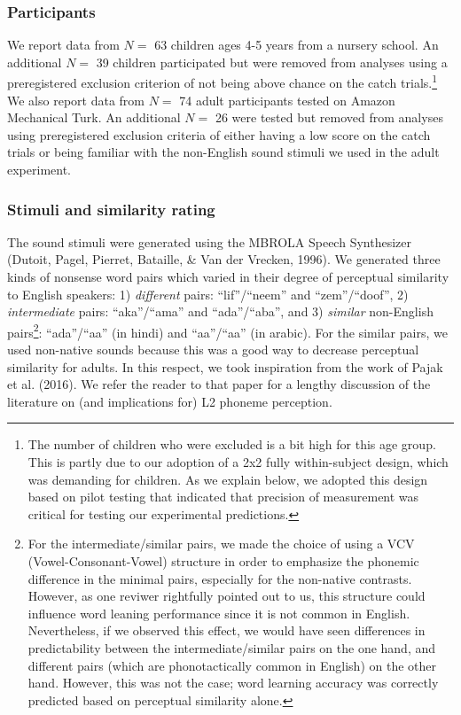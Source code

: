\documentclass[english,,man]{apa6}
\let\rmarkdownfootnote\footnote%
\def\footnote{\protect\rmarkdownfootnote}
\begin{document}
\hypertarget{participants}{%
\subsubsection{Participants}\label{participants}}

We report data from \(N=\) 63 children ages 4-5 years from a nursery school. An additional \(N=\) 39 children participated but were removed from analyses using a preregistered exclusion criterion of not being above chance on the catch trials.\footnote{The number of children who were excluded is a bit high for this age group. This is partly due to our adoption of a 2x2 fully within-subject design, which was demanding for children. As we explain below, we adopted this design based on pilot testing that indicated that precision of measurement was critical for testing our experimental predictions.} We also report data from \(N=\) 74 adult participants tested on Amazon Mechanical Turk. An additional \(N=\) 26 were tested but removed from analyses using preregistered exclusion criteria of either having a low score on the catch trials or being familiar with the non-English sound stimuli we used in the adult experiment.

\hypertarget{stimuli-and-similarity-rating}{%
\subsubsection{Stimuli and similarity rating}\label{stimuli-and-similarity-rating}}

The sound stimuli were generated using the MBROLA Speech Synthesizer (Dutoit, Pagel, Pierret, Bataille, \& Van der Vrecken, 1996). We generated three kinds of nonsense word pairs which varied in their degree of perceptual similarity to English speakers: 1) \emph{different} pairs: \enquote{lif}/\enquote{neem} and \enquote{zem}/\enquote{doof}, 2) \emph{intermediate} pairs: \enquote{aka}/\enquote{ama} and \enquote{ada}/\enquote{aba}, and 3) \emph{similar} non-English pairs\footnote{For the intermediate/similar pairs, we made the choice of using a VCV (Vowel-Consonant-Vowel) structure in order to emphasize the phonemic difference in the minimal pairs, especially for the non-native contrasts. However, as one reviwer rightfully pointed out to us, this structure could influence word leaning performance since it is not common in English. Nevertheless, if we observed this effect, we would have seen differences in predictability between the intermediate/similar pairs on the one hand, and different pairs (which are phonotactically common in English) on the other hand. However, this was not the case; word learning accuracy was correctly predicted based on perceptual similarity alone.}: \enquote{ada}/\enquote{aa} (in hindi) and \enquote{aa}/\enquote{a\textipa{\textcrh}a} (in arabic). For the similar pairs, we used non-native sounds because this was a good way to decrease perceptual similarity for adults. In this respect, we took inspiration from the work of Pajak et al. (2016). We refer the reader to that paper for a lengthy discussion of the literature on (and implications for) L2 phoneme perception.
\end{document}
